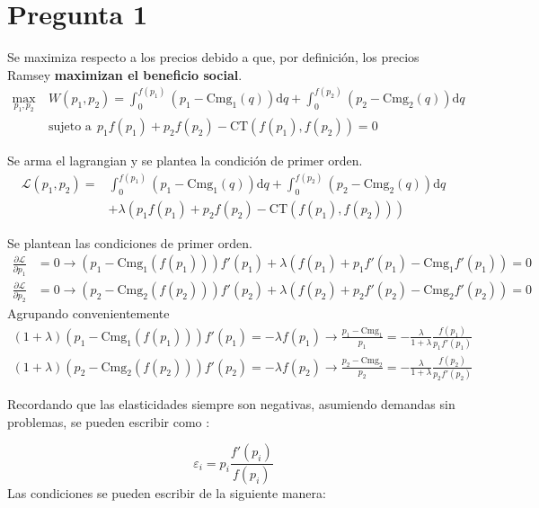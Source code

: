 \documentclass{article}
\begin{document}
\section*{Pregunta 1}

Se maximiza respecto a los precios debido a que, por definición, los precios Ramsey \textbf{maximizan el beneficio social}.
\begin{align*}
    \max_{p_1,p_2} \ &W(p_1,p_2) = \int_{0}^{f(p_1)} \left(p_1 - \text{Cmg}_1(q)\right)\text{d}q + \int_{0}^{f(p_2)} \left(p_2 - \text{Cmg}_2(q)\right)\text{d}q \\
    &\text{sujeto a} \ \  p_1f(p_1) + p_2f(p_2) - \text{CT}(f(p_1),f(p_2)) = 0
\end{align*}

Se arma el lagrangian y se plantea la condición de primer orden.
\begin{align*}
    \mathcal{L}(p_1,p_2) =& \int_{0}^{f(p_1)} \left(p_1 - \text{Cmg}_1(q)\right)\text{d}q + \int_{0}^{f(p_2)} \left(p_2 - \text{Cmg}_2(q)\right)\text{d}q \\ 
    & + \lambda \left( p_1f(p_1) +p_2f(p_2) - \text{CT}\left(f(p_1),f(p_2)\right) \right)
\end{align*}

Se plantean las condiciones de primer orden.
\begin{align*}
    \frac{\partial \mathcal{L}}{\partial p_1} &= 0 \to \left(p_1 - \text{Cmg}_1(f(p_1))\right)f'(p_1) + \lambda \left( f(p_1) + p_1f'(p_1) - \text{Cmg}_1f'(p_1)\right) = 0\\ 
    \frac{\partial \mathcal{L}}{\partial p_2} &= 0 \to \left(p_2 - \text{Cmg}_2(f(p_2))\right)f'(p_2) + \lambda \left( f(p_2) + p_2f'(p_2) - \text{Cmg}_2f'(p_2)\right) = 0
\end{align*}
Agrupando convenientemente
\begin{align*}
    (1+\lambda)\left(p_1 - \text{Cmg}_1(f(p_1))\right)f'(p_1) = -\lambda f(p_1) \to \frac{p_1 - \text{Cmg}_1}{p_1} =- \frac{\lambda}{1+\lambda}\frac{f(p_1)}{p_1f'(p_1)} \\ 
    (1+\lambda)\left(p_2 - \text{Cmg}_2(f(p_2))\right)f'(p_2) = -\lambda f(p_2) \to \frac{p_2 - \text{Cmg}_2}{p_2} =- \frac{\lambda}{1+\lambda}\frac{f(p_2)}{p_2f'(p_2)}
\end{align*}

Recordando que las elasticidades siempre son negativas, asumiendo demandas sin problemas, se pueden escribir como :

\begin{equation*}
    \varepsilon_i = p_i\frac{f'(p_i)}{f(p_i)}
\end{equation*}
Las condiciones se pueden escribir de la siguiente manera:
\end{document}
